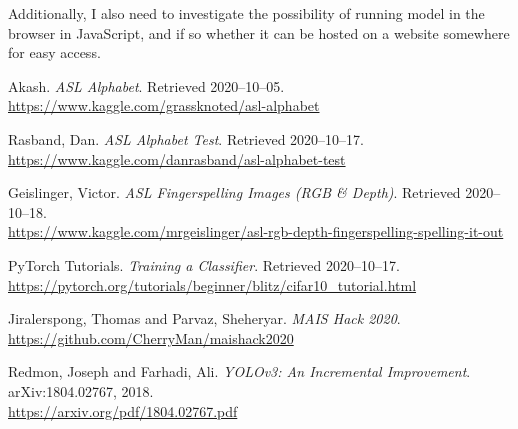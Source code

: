\documentclass[12pt]{article}
\begin{document}
Additionally, I also need to investigate the possibility of running
model in the browser in JavaScript, and if so whether it can be hosted
on a website somewhere for easy access.

\begin{thebibliography}{6}
  Akash. \textit{ASL Alphabet}. Retrieved 2020--10--05.
  \\\url{https://www.kaggle.com/grassknoted/asl-alphabet}

  Rasband, Dan. \textit{ASL Alphabet Test}. Retrieved 2020--10--17.
  \\\url{https://www.kaggle.com/danrasband/asl-alphabet-test}

  Geislinger, Victor. \textit{ASL Fingerspelling Images (RGB \& Depth)}.
  Retrieved 2020--10--18.
  \\\url{https://www.kaggle.com/mrgeislinger/asl-rgb-depth-fingerspelling-spelling-it-out}

  PyTorch Tutorials. \textit{Training a Classifier}. Retrieved
  2020--10--17.
  \\\url{https://pytorch.org/tutorials/beginner/blitz/cifar10_tutorial.html}

  Jiralerspong, Thomas and Parvaz, Sheheryar. \textit{MAIS Hack 2020}.
  \\\url{https://github.com/CherryMan/maishack2020}

  Redmon, Joseph and Farhadi, Ali.
  \textit{YOLOv3: An Incremental Improvement}.
  arXiv:1804.02767, 2018.
  \\\url{https://arxiv.org/pdf/1804.02767.pdf}
\end{thebibliography}
\end{document}
